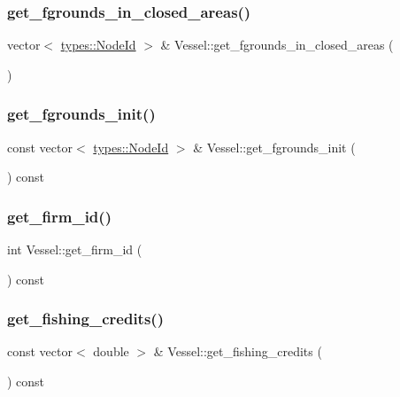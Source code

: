 \subsubsection{\texorpdfstring{get\_fgrounds\_in\_closed\_areas()}{get\_fgrounds\_in\_closed\_areas()}}
{\footnotesize\ttfamily vector$<$ \mbox{\hyperlink{classtypes_1_1_node_id}{types\+::\+Node\+Id}} $>$ \& Vessel\+::get\+\_\+fgrounds\+\_\+in\+\_\+closed\+\_\+areas (\begin{DoxyParamCaption}{ }\end{DoxyParamCaption})}

\mbox{\label{class_vessel_adf36cfd1455af4248e7a1898e0738be2}} 
\subsubsection{\texorpdfstring{get\_fgrounds\_init()}{get\_fgrounds\_init()}}
{\footnotesize\ttfamily const vector$<$ \mbox{\hyperlink{classtypes_1_1_node_id}{types\+::\+Node\+Id}} $>$ \& Vessel\+::get\+\_\+fgrounds\+\_\+init (\begin{DoxyParamCaption}{ }\end{DoxyParamCaption}) const}

\mbox{\label{class_vessel_adb8e199cb64c9b0fd5d936cfe118aecf}} 
\subsubsection{\texorpdfstring{get\_firm\_id()}{get\_firm\_id()}}
{\footnotesize\ttfamily int Vessel\+::get\+\_\+firm\+\_\+id (\begin{DoxyParamCaption}{ }\end{DoxyParamCaption}) const}

\mbox{\label{class_vessel_a41561e528d1c3253a393be9bd93a9423}} 
\subsubsection{\texorpdfstring{get\_fishing\_credits()}{get\_fishing\_credits()}}
{\footnotesize\ttfamily const vector$<$ double $>$ \& Vessel\+::get\+\_\+fishing\+\_\+credits (\begin{DoxyParamCaption}{ }\end{DoxyParamCaption}) const}

